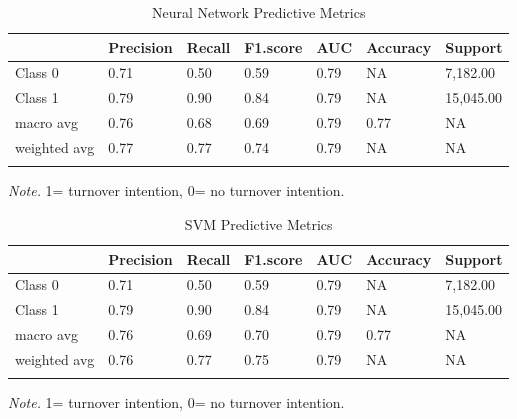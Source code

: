 \documentclass[
  man]{apa7}
\begin{document}
\begin{table}[tbp]

\begin{center}
\begin{threeparttable}

\caption{\label{tab:nn75}Neural Network Predictive Metrics}

\begin{tabular}{lllllll}
\toprule
 & \multicolumn{1}{c}{Precision} & \multicolumn{1}{c}{Recall} & \multicolumn{1}{c}{F1.score} & \multicolumn{1}{c}{AUC} & \multicolumn{1}{c}{Accuracy} & \multicolumn{1}{c}{Support}\\
\midrule
Class 0 & 0.71 & 0.50 & 0.59 & 0.79 & NA & 7,182.00\\
Class 1 & 0.79 & 0.90 & 0.84 & 0.79 & NA & 15,045.00\\
macro avg & 0.76 & 0.68 & 0.69 & 0.79 & 0.77 & NA\\
weighted avg & 0.77 & 0.77 & 0.74 & 0.79 & NA & NA\\
\bottomrule
\addlinespace
\end{tabular}

\begin{tablenotes}[para]
\normalsize{\textit{Note.} 1= turnover intention, 0= no turnover intention.}
\end{tablenotes}

\end{threeparttable}
\end{center}

\end{table}

\begin{table}[tbp]

\begin{center}
\begin{threeparttable}

\caption{\label{tab:svm75}SVM Predictive Metrics}

\begin{tabular}{lllllll}
\toprule
 & \multicolumn{1}{c}{Precision} & \multicolumn{1}{c}{Recall} & \multicolumn{1}{c}{F1.score} & \multicolumn{1}{c}{AUC} & \multicolumn{1}{c}{Accuracy} & \multicolumn{1}{c}{Support}\\
\midrule
Class 0 & 0.71 & 0.50 & 0.59 & 0.79 & NA & 7,182.00\\
Class 1 & 0.79 & 0.90 & 0.84 & 0.79 & NA & 15,045.00\\
macro avg & 0.76 & 0.69 & 0.70 & 0.79 & 0.77 & NA\\
weighted avg & 0.76 & 0.77 & 0.75 & 0.79 & NA & NA\\
\bottomrule
\addlinespace
\end{tabular}

\begin{tablenotes}[para]
\normalsize{\textit{Note.} 1= turnover intention, 0= no turnover intention.}
\end{tablenotes}

\end{threeparttable}
\end{center}

\end{table}
\end{document}
